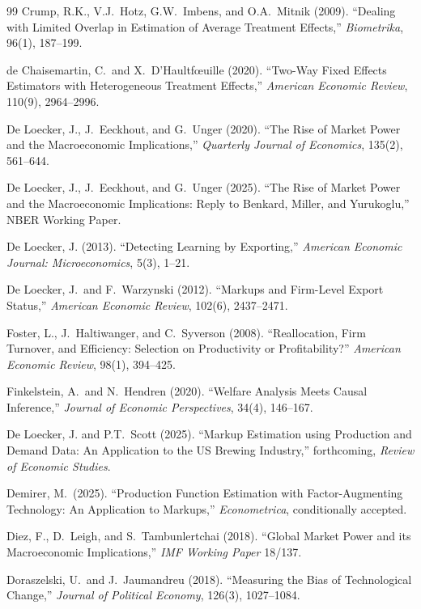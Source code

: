 \documentclass[11pt]{article}
\begin{document}
\begin{thebibliography}{99}
 Crump, R.K., V.J.~Hotz, G.W.~Imbens, and O.A.~Mitnik (2009). ``Dealing with Limited Overlap in Estimation of Average Treatment Effects,'' \emph{Biometrika}, 96(1), 187--199.

 de Chaisemartin, C.\ and X.\ D'Haultf\oe uille (2020). ``Two-Way Fixed Effects Estimators with Heterogeneous Treatment Effects,'' \emph{American Economic Review}, 110(9), 2964--2996.

 De Loecker, J., J.~Eeckhout, and G.~Unger (2020). ``The Rise of Market Power and the Macroeconomic Implications,'' \emph{Quarterly Journal of Economics}, 135(2), 561--644.

 De Loecker, J., J.~Eeckhout, and G.~Unger (2025). ``The Rise of Market Power and the Macroeconomic Implications: Reply to Benkard, Miller, and Yurukoglu,'' NBER Working Paper.

 De Loecker, J. (2013). ``Detecting Learning by Exporting,'' \emph{American Economic Journal: Microeconomics}, 5(3), 1--21.

 De Loecker, J.\ and F.~Warzynski (2012). ``Markups and Firm-Level Export Status,'' \emph{American Economic Review}, 102(6), 2437--2471.

 Foster, L., J.~Haltiwanger, and C.~Syverson (2008). ``Reallocation, Firm Turnover, and Efficiency: Selection on Productivity or Profitability?'' \emph{American Economic Review}, 98(1), 394--425.

 Finkelstein, A.\ and N.~Hendren (2020). ``Welfare Analysis Meets Causal Inference,'' \emph{Journal of Economic Perspectives}, 34(4), 146--167.

 De Loecker, J. and P.T.\ Scott (2025). ``Markup Estimation using Production and Demand Data: An Application to the US Brewing Industry,'' forthcoming, \emph{Review of Economic Studies}.

 Demirer, M.\ (2025). ``Production Function Estimation with Factor-Augmenting Technology: An Application to Markups,'' \emph{Econometrica}, conditionally accepted.

 Diez, F., D.~Leigh, and S.~Tambunlertchai (2018). ``Global Market Power and its Macroeconomic Implications,'' \emph{IMF Working Paper} 18/137.

 Doraszelski, U.\ and J.~Jaumandreu (2018). ``Measuring the Bias of Technological Change,'' \emph{Journal of Political Economy}, 126(3), 1027--1084.


\end{thebibliography}
\end{document}
